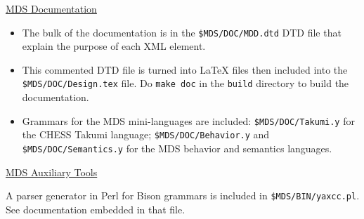 \documentclass[a4]{seminar}
\begin{document}
\begin{slide}

\begin{center} \underline{MDS Documentation} \end{center}

\begin{itemize}

\item The bulk of the documentation is in the \verb|$MDS/DOC/MDD.dtd| DTD
file that explain the purpose of each XML element.

\item This commented DTD file is turned into LaTeX files then included into
the \verb|$MDS/DOC/Design.tex| file. Do \verb|make doc| in the \verb|build|
directory to build the documentation.

\item Grammars for the MDS mini-languages are included: \verb|$MDS/DOC/Takumi.y|
for the CHESS Takumi language; \verb|$MDS/DOC/Behavior.y| and
  \verb|$MDS/DOC/Semantics.y| for the MDS behavior and semantics languages.

\end{itemize}

\begin{center} \underline{MDS Auxiliary Tools} \end{center}

A parser generator in Perl for Bison grammars is included in
\verb|$MDS/BIN/yaxcc.pl|. See documentation embedded in that file.

\end{slide}
\end{document}

